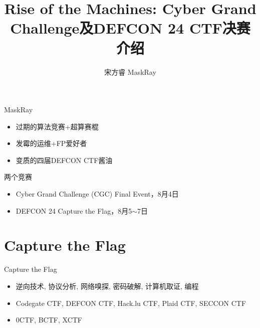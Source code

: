 \documentclass{beamer}
\title{Rise of the Machines: Cyber Grand Challenge及DEFCON 24 CTF决赛介绍}
\author{宋方睿 MaskRay}
\institute{https://maskray.me}
\date{}
\begin{document}
\begin{frame}
  \titlepage
\end{frame}

\begin{frame}
  \tableofcontents
\end{frame}

{

  \begin{frame}
    \begin{block}{MaskRay}
      \begin{itemize}[<+-|alert@+>]
        \item 过期的算法竞赛+超算赛棍
        \item 发霉的运维+FP爱好者
        \item 变质的四届DEFCON CTF酱油
      \end{itemize}
    \end{block}
  \end{frame}
}

\begin{frame}
  \begin{block}{两个竞赛}
    \begin{itemize}
      \item Cyber Grand Challenge (CGC) Final Event，8月4日
      \item DEFCON 24 Capture the Flag，8月5$\sim$7日
    \end{itemize}
  \end{block}
\end{frame}

\section{Capture the Flag}

\begin{frame}
  \begin{block}{Capture the Flag}
    \begin{itemize}
      \item 逆向技术, 协议分析, 网络嗅探, 密码破解, 计算机取证, 编程
      \item Codegate CTF, DEFCON CTF, Hack.lu CTF, Plaid CTF, SECCON CTF
      \item 0CTF, BCTF, XCTF
    \end{itemize}
  \end{block}
\end{frame}
\end{document}
